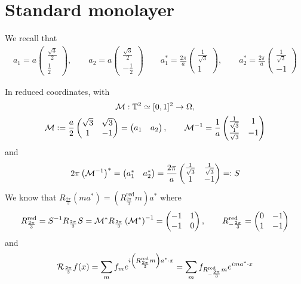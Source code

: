 \documentclass[11pt,a4paper,reqno,french,tikz]{amsart}
\title[]{}
\author[L. Garrigue]{Louis Garrigue}
\date{\today}
\newcommand{\pa}[1]{\left( #1 \right)} %
\newcommand{\f}[2]{\frac{#1}{#2}} %
\newcommand{\mat}[1]{\begin{pmatrix} #1 \end{pmatrix}} %
\begin{document}
\maketitle

\section{Standard monolayer}%
\label{sec:standard_monolayer}

We recall that 
\begin{multline*}
a_1 = a \mat{ \f{\sqrt 3}2 \\ \f 12}, \qquad a_2 = a \mat{ \f{\sqrt 3}2 \\ -\f 12} \qquad a^*_1 = \f{2\pi}{a} \mat{ \f{1}{\sqrt 3} \\ 1}, \qquad a^*_2 = \f{2\pi}{a} \mat{ \f{1}{\sqrt 3} \\ -1}
\end{multline*}

In reduced coordinates, with 
\begin{multline*}
	\cM : \mathbb{T}^2 \simeq [0,1]^2 \rightarrow \Omega, \\
	\cM :=  \f a2 \mat{\sqrt{3} & \sqrt{3} \\ 1 & -1} = \mat{a_1 & a_2}, \qquad  \cM^{-1} = \f 1a \mat{\f 1{\sqrt 3} & 1 \\ \f 1{\sqrt 3} & -1}
\end{multline*}
and
\begin{align*}
	2\pi \pa{\cM^{-1}}^* = \mat{a_1^* & a_2^*} = \f{2\pi}a \mat{\f{1}{\sqrt 3} & \f{1}{\sqrt 3} \\ 1 & -1} =: S
\end{align*}
We know that $R_{\f{2\pi}3} \pa{ma^* } = \pa{R_{\f{2\pi}3}^{\text{red}} m} a^*$ where
\begin{align*}
	R_{\f{2\pi}3}^{\text{red}} = S^{-1} R_{\f{2\pi}3} S =  \cM^* R_{\f{2\pi}3} \pa{\cM^*}^{-1} = \mat{-1 & 1 \\ -1 & 0}, \qquad R_{-\f{2\pi}3}^{\text{red}} = \mat{0 & -1 \\ 1 & -1}
\end{align*}
and
\begin{align*}
\cR_{\f{2\pi}3} f(x) = \sum_m f_m e^{i \pa{R_{\f{2\pi}3}^{\text{red}} m} a^* \cdot x} = \sum_m f_{R_{-\f{2\pi}3}^{\text{red}} m} e^{im a^* \cdot x}
\end{align*}
\end{document}
